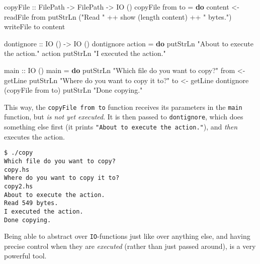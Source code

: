 \documentclass[11pt,
  american,
  DIV13]{article}
\newenvironment{Shaded}{}{}
\newcommand{\DataTypeTok}[1]{\textcolor[rgb]{0.56,0.13,0.00}{#1}}
\newcommand{\FunctionTok}[1]{\textcolor[rgb]{0.02,0.16,0.49}{#1}}
\newcommand{\KeywordTok}[1]{\textcolor[rgb]{0.00,0.44,0.13}{\textbf{#1}}}
\newcommand{\NormalTok}[1]{#1}
\newcommand{\OperatorTok}[1]{\textcolor[rgb]{0.40,0.40,0.40}{#1}}
\newcommand{\OtherTok}[1]{\textcolor[rgb]{0.00,0.44,0.13}{#1}}
\newcommand{\StringTok}[1]{\textcolor[rgb]{0.25,0.44,0.63}{#1}}
\begin{document}
\begin{Shaded}
\begin{Highlighting}[]
\OtherTok{copyFile ::} \DataTypeTok{FilePath} \OtherTok{{-}\textgreater{}} \DataTypeTok{FilePath} \OtherTok{{-}\textgreater{}} \DataTypeTok{IO}\NormalTok{ ()}
\NormalTok{copyFile from to }\OtherTok{=} \KeywordTok{do}
\NormalTok{    content }\OtherTok{\textless{}{-}} \FunctionTok{readFile}\NormalTok{ from}
    \FunctionTok{putStrLn}\NormalTok{ (}\StringTok{"Read "} \OperatorTok{++} \FunctionTok{show}\NormalTok{ (}\FunctionTok{length}\NormalTok{ content) }\OperatorTok{++} \StringTok{" bytes."}\NormalTok{)}
    \FunctionTok{writeFile}\NormalTok{ to content}

\OtherTok{don\textquotesingle{}tignore ::} \DataTypeTok{IO}\NormalTok{ () }\OtherTok{{-}\textgreater{}} \DataTypeTok{IO}\NormalTok{ ()}
\NormalTok{don\textquotesingle{}tignore action }\OtherTok{=} \KeywordTok{do}
    \FunctionTok{putStrLn} \StringTok{"About to execute the action."}
\NormalTok{    action}
    \FunctionTok{putStrLn} \StringTok{"I executed the action."}

\OtherTok{main ::} \DataTypeTok{IO}\NormalTok{ ()}
\NormalTok{main }\OtherTok{=} \KeywordTok{do}
    \FunctionTok{putStrLn} \StringTok{"Which file do you want to copy?"}
\NormalTok{    from }\OtherTok{\textless{}{-}} \FunctionTok{getLine}
    \FunctionTok{putStrLn} \StringTok{"Where do you want to copy it to?"}
\NormalTok{    to }\OtherTok{\textless{}{-}} \FunctionTok{getLine}
\NormalTok{    don\textquotesingle{}tignore (copyFile from to)}
    \FunctionTok{putStrLn} \StringTok{"Done copying."}
\end{Highlighting}
\end{Shaded}

This way, the \texttt{copyFile\ from\ to} function receives its
parameters in the \texttt{main} function, but \emph{is not yet
executed}. It is then passed to \texttt{don\textquotesingle{}tignore},
which does something else first (it prints
\texttt{"About\ to\ execute\ the\ action."}), and \emph{then} executes
the action.

\begin{verbatim}
$ ./copy
Which file do you want to copy?
copy.hs
Where do you want to copy it to?
copy2.hs
About to execute the action.
Read 549 bytes.
I executed the action.
Done copying.
\end{verbatim}

Being able to abstract over \texttt{IO}-functions just like over
anything else, and having precise control when they are \emph{executed}
(rather than just passed around), is a very powerful tool.
\end{document}
